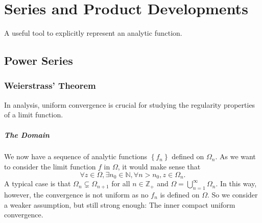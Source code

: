 \documentclass[../main.tex]{subfiles}
\begin{document}
\chapter{Series and Product Developments}

A useful tool to explicitly represent an analytic function.

\section{Power Series}
\subsection{Weierstrass' Theorem}

In analysis, uniform convergence is crucial for studying the regularity properties of a limit function.

\paragraph{The Domain}
We now have a sequence of analytic functions $\left\{ f_n \right\}$ defined on $\Omega_n$. As we want to consider the limit function $f$ in $\Omega$, it would make sense that
\begin{equation*}
	\forall z\in \Omega, \exists n_0\in \mathbb{N}, \forall n>n_0, z\in \Omega_n.
\end{equation*}
A typical case is that $\Omega_n \subsetneq \Omega_{n+1}$ for all $n\in \mathbb{Z}_+$ and $\Omega = \bigcup_{n=1}^{\infty} \Omega_n$. In this way, however, the convergence is not uniform as no $f_n$ is defined on $\Omega$. So we consider a weaker assumption, but still strong enough: The inner compact uniform convergence.
\end{document}
